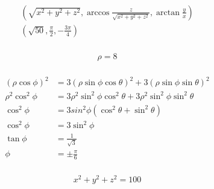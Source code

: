 \documentclass{article}
\begin{document}
\setcounter{subsubsection}{62}
\subsubsection{}

\begin{align*}
  \left( \sqrt{x^2 + y^2 + z^2}, \arccos \frac{z}{\sqrt{x^2 + y^2 + z^2}}, \arctan \frac{y}{x} \right) \\
  \left( \sqrt{50}, \frac{\pi}{2}, -\frac{3 \pi}{4} \right)
\end{align*}

\setcounter{subsubsection}{66}
\subsubsection{}

\[\rho = 8\]

\setcounter{subsubsection}{68}
\subsubsection{}

\begin{align*}
  (\rho \cos \phi)^2 & = 3 (\rho \sin \phi \cos \theta)^2 + 3 (\rho \sin \phi \sin \theta)^2     \\
  \rho^2 \cos^2 \phi & = 3 \rho^2 \sin^2 \phi \cos^2 \theta + 3 \rho^2 \sin^2 \phi \sin^2 \theta \\
  \cos^2 \phi        & = 3 sin^2 \phi (\cos^2 \theta + \sin^2 \theta)                            \\
  \cos^2 \phi        & = 3 \sin^2 \phi                                                           \\
  \tan \phi          & = \frac{1}{\sqrt{3}}                                                      \\
  \phi               & = \pm \frac{\pi}{6}
\end{align*}

\setcounter{subsubsection}{70}
\subsubsection{}

\[x^2 + y^2 + z^2 = 100\]

\setcounter{subsubsection}{72}
\subsubsection{}
\end{document}
